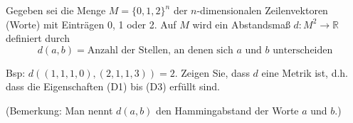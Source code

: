 Gegeben sei die Menge \( M = \{0, 1, 2\}^n \) der \( n \)-dimensionalen Zeilenvektoren (Worte) mit Einträgen 0, 1 oder 2. Auf \( M \) wird ein Abstandsmaß \( d \colon M^2 \to \mathbb{R} \) definiert durch
\[ d(a, b) = \text{Anzahl der Stellen, an denen sich } a \text{ und } b \text{ unterscheiden} \]

Bsp: \( d((1, 1, 1, 0), (2, 1, 1, 3)) = 2 \). Zeigen Sie, dass \( d \) eine Metrik ist, d.h. dass die Eigenschaften (D1) bis (D3) erfüllt sind.

(Bemerkung: Man nennt \( d(a, b) \) den Hammingabstand der Worte \( a \) und \( b \).)
